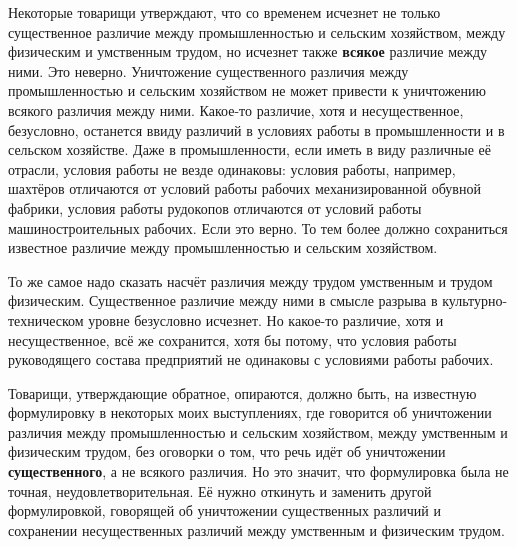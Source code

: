 \documentclass[12pt, a4paper, openany]{book}
\begin{document}
Некоторые товарищи утверждают, что со временем исчезнет не только существенное различие между промышленностью и сельским хозяйством, между физическим и умственным трудом, но исчезнет также \textbf{всякое} различие между ними. Это неверно. Уничтожение существенного различия между промышленностью и сельским хозяйством не может привести к уничтожению всякого различия между ними. Какое-то различие, хотя и несущественное, безусловно, останется ввиду различий в условиях работы в промышленности и в сельском хозяйстве. Даже в промышленности, если иметь в виду различные её отрасли, условия работы не везде одинаковы: условия работы, например, шахтёров отличаются от условий работы рабочих механизированной обувной фабрики, условия работы рудокопов отличаются от условий работы машиностроительных рабочих. Если это верно. То тем более должно сохраниться известное различие между промышленностью и сельским хозяйством.



То же самое надо сказать насчёт различия между трудом умственным и трудом физическим. Существенное различие между ними в смысле разрыва в культурно-техническом уровне безусловно исчезнет. Но какое-то различие, хотя и несущественное, всё же сохранится, хотя бы потому, что условия работы руководящего состава предприятий не одинаковы с условиями работы рабочих.



Товарищи, утверждающие обратное, опираются, должно быть, на известную формулировку в некоторых моих выступлениях, где говорится об уничтожении различия между промышленностью и сельским хозяйством, между умственным и физическим трудом, без оговорки о том, что речь идёт об уничтожении \textbf{существенного}, а не всякого различия. Но это значит, что формулировка была не точная, неудовлетворительная. Её нужно откинуть и заменить другой формулировкой, говорящей об уничтожении существенных различий и сохранении несущественных различий между умственным и физическим трудом.



\vspace{0.4cm}



\subsection[5. Вопрос о распаде единого мирового рынка и углублении кризиса мировой капиталистической системы]{}
\end{document}
